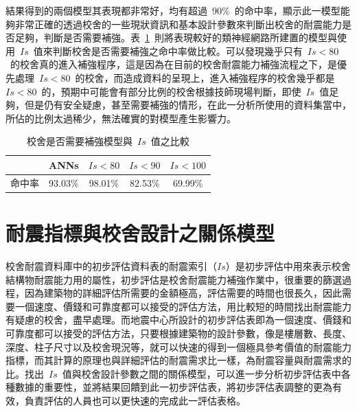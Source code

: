 結果得到的兩個模型其表現都非常好，均有超過~90\%~的命中率，顯示此一模型能夠非常正確的透過校舍的一些現狀資訊和基本設計參數來判斷出校舍的耐震能力是否足夠，判斷是否需要補強。表~\ref{tab:d_is_r_is_result}~則將表現較好的類神經網路所建置的模型與使用~$Is$~值來判斷校舍是否需要補強之命中率做比較。可以發現幾乎只有~$Is < 80$~的校舍真的進入補強程序，這是因為在目前的校舍耐震能力補強流程之下，是優先處理~$Is < 80$~的校舍，而造成資料的呈現上，進入補強程序的校舍幾乎都是~$Is < 80$~的，預期中可能會有部分比例的校舍根據技師現場判斷，即使~$Is$~值足夠，但是仍有安全疑慮，甚至需要補強的情形，在此一分析所使用的資料集當中，所佔的比例太過稀少，無法確實的對模型產生影響力。


{\renewcommand{\arraystretch}{1.5}
\begin{table}[hbtp]
  \begin{center}
    \caption{校舍是否需要補強模型與~$Is$~值之比較}
    \label{tab:d_is_r_is_result}
    \large
    \begin{tabular}{l c c c c}
      \hline
       & ANNs & $Is < 80$ & $Is < 90$ & $Is < 100$ \\
      \hline
     命中率 & 93.03\% & 98.01\% & 82.53\% & 69.99\% \\
      \hline
      \end{tabular}
  \end{center}
\end{table}
}















\section{耐震指標與校舍設計之關係模型}

校舍耐震資料庫中的初步評估資料表的耐震索引（$Is$）是初步評估中用來表示校舍結構物耐震能力用的屬性，初步評估是校舍耐震能力補強作業中，很重要的篩選過程，因為建築物的詳細評估所需要的金額極高，評估需要的時間也很長久，因此需要一個速度、價錢和可靠度都可以接受的評估方法，用比較短的時間找出耐震能力有疑慮的校舍，盡早處理。而地震中心所設計的初步評估表即為一個速度、價錢和可靠度都可以接受的評估方法，只要根據建築物的設計參數，像是樓層數、長度、深度、柱子尺寸以及校舍現況等，就可以快速的得到一個極具參考價值的耐震能力指標，而其計算的原理也與詳細評估的耐震需求比一樣，為耐震容量與耐震需求的比。找出~$Is$~值與校舍設計參數之間的關係模型，可以進一步分析初步評估表中各種數據的重要性，並將結果回饋到此一初步評估表，將初步評估表調整的更為有效，負責評估的人員也可以更快速的完成此一評估表格。

